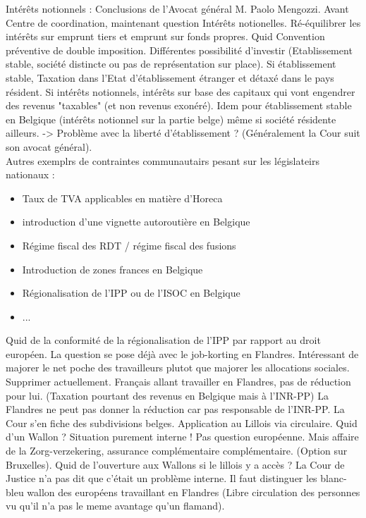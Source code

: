 \documentclass{book}
\begin{document}
Intérêts notionnels : Conclusions de l'Avocat général M. Paolo Mengozzi. Avant Centre de coordination, maintenant question Intérêts notionelles. Ré-équilibrer les intérêts sur emprunt tiers et emprunt sur fonds propres. Quid Convention préventive de double imposition. Différentes possibilité d'investir (Etablissement stable, société distincte ou pas de représentation sur place). Si établissement stable, Taxation dans l'Etat d'établissement étranger et détaxé dans le pays résident. Si intérêts notionnels, intérêts sur base des capitaux qui vont engendrer des revenus "taxables" (et non revenus exonéré). Idem pour établissement stable en Belgique (intérêts notionnel sur la partie belge) même si société résidente ailleurs. -> Problème avec la liberté d'établissement ? (Généralement la Cour suit son avocat général).\\

Autres exemplrs de contraintes communautairs pesant sur les législateirs nationaux :

\begin{itemize}
\item Taux de TVA applicables en matière d'Horeca
\item introduction d'une vignette autoroutière en Belgique
\item Régime fiscal des RDT / régime fiscal des fusions
\item Introduction de zones frances en Belgique
\item Régionalisation de l'IPP ou de l'ISOC en Belgique
\item ...
\end{itemize}

Quid de la conformité de la régionalisation de l'IPP par rapport au droit européen. La question se pose déjà avec le job-korting en Flandres. Intéressant de majorer le net poche des travailleurs plutot que majorer les allocations sociales. Supprimer actuellement. Français allant travailler en Flandres, pas de réduction pour lui. (Taxation pourtant des revenus en Belgique mais à l'INR-PP) La Flandres ne peut pas donner la réduction car pas responsable de l'INR-PP. La Cour s'en fiche des subdivisions belges. Application au Lillois via circulaire. Quid  d'un Wallon ? Situation purement interne ! Pas question européenne. Mais affaire de la Zorg-verzekering, assurance complémentaire complémentaire. (Option sur Bruxelles). Quid de l'ouverture aux Wallons si le lillois y a accès ? La Cour de Justice n'a pas dit que c'était un problème interne. Il faut distinguer les blanc-bleu wallon des européens travaillant en Flandres (Libre circulation des personnes vu qu'il n'a pas le meme avantage qu'un flamand).\\
\end{document}
